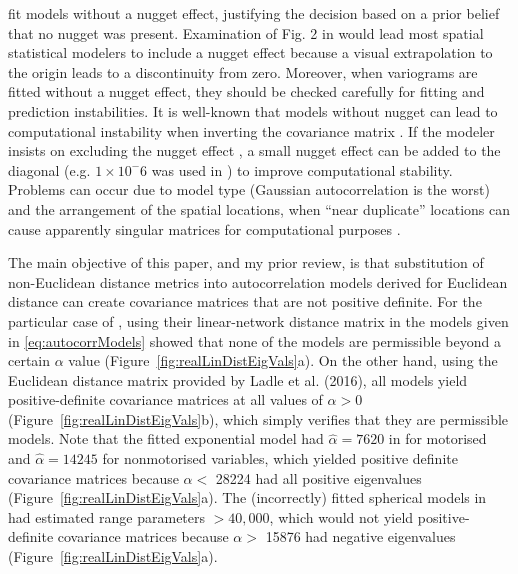 \documentclass[11pt, titlepage]{article}\usepackage[]{graphicx}\usepackage[]{color}
\begin{document}
\begin{spacing}{1.9}
\begin{flushleft}
\citet{Ladl:Avga:Whea:Boyc:pred:2016} fit models without a nugget effect, justifying the decision based on a prior belief that no nugget was present. Examination of Fig. 2 in \citet{Ladl:Avga:Whea:Boyc:pred:2016} would lead most spatial statistical modelers to include a nugget effect because a visual extrapolation to the origin leads to a discontinuity from zero.  Moreover, when variograms are fitted without a nugget effect, they should be checked carefully for fitting and prediction instabilities. It is well-known that models without nugget can lead to computational instability when inverting the covariance matrix \citep{Diam:Arms:robu:1984,Posa:cond:1989,ODow:cond:1991,Abab:cond:1994}. If the modeler insists on excluding the nugget effect \citep[as often occurs when using kriging to approximate deterministic computer models, e.g.][]{Mart:Simp:krig:2005}, a small nugget effect can be added to the diagonal (e.g. $1 \times 10^-6$ was used in \citet{Book:Denn:Fran:Sera:etal:rigo:1999}) to improve computational stability.  Problems can occur due to model type (Gaussian autocorrelation is the worst) and the arrangement of the spatial locations, when ``near duplicate'' locations can cause apparently singular matrices for computational purposes \citep[][p. 220]{Biva:Pebe:Gome:appl:2008}.

The main objective of this paper, and my prior review, is that substitution of non-Euclidean distance metrics into autocorrelation models derived for Euclidean distance can create covariance matrices that are not positive definite. For the particular case of \citet{Ladl:Avga:Whea:Boyc:pred:2016}, using their linear-network distance matrix in the models given in \ref{eq:autocorrModels} showed that none of the models are permissible beyond a certain $\alpha$ value (Figure~\ref{fig:realLinDistEigVals}a).  On the other hand, using the Euclidean distance matrix provided by Ladle et al. (2016), all models yield positive-definite covariance matrices at all values of $\alpha > 0$ (Figure~\ref{fig:realLinDistEigVals}b), which simply verifies that they are permissible models.  Note that the fitted exponential model had $\hat{\alpha} = 7620$ in \citet{Ladl:Avga:Whea:Boyc:pred:2016} for motorised and $\hat{\alpha} = 14245$ for nonmotorised variables, which yielded positive definite covariance matrices because $\alpha <$ 28224 had all positive eigenvalues (Figure~\ref{fig:realLinDistEigVals}a). The (incorrectly) fitted spherical models in \citet{Ladl:Avga:Whea:Boyc:pred:2016} had estimated range parameters $>40,000$, which would not yield positive-definite covariance matrices because $\alpha >$ 15876 had negative eigenvalues (Figure~\ref{fig:realLinDistEigVals}a).


\end{flushleft}
\end{spacing}
\end{document}
